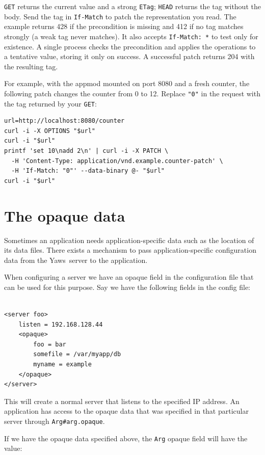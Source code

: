 \documentclass[11pt,oneside,english]{book}
\newcommand{\Yaws}            %
        {{\sc Yaws}}
\begin{document}
\verb+GET+ returns the current value and a strong \verb+ETag+;
\verb+HEAD+ returns the tag without the body. Send the tag in
\verb+If-Match+ to patch the representation you read. The example
returns 428 if the precondition is missing and 412 if no tag matches
strongly (a weak tag never matches). It also accepts \verb+If-Match: *+
to test only for existence. A single process checks the precondition
and applies the operations to a tentative value, storing it only on
success. A successful patch returns 204 with the resulting tag.

For example, with the appmod mounted on port 8080 and a fresh counter,
the following patch changes the counter from 0 to 12. Replace
\verb+"0"+ in the request with the tag returned by your \verb+GET+:

\begin{verbatim}
url=http://localhost:8080/counter
curl -i -X OPTIONS "$url"
curl -i "$url"
printf 'set 10\nadd 2\n' | curl -i -X PATCH \
  -H 'Content-Type: application/vnd.example.counter-patch' \
  -H 'If-Match: "0"' --data-binary @- "$url"
curl -i "$url"
\end{verbatim}


\section{The opaque data}

Sometimes an application needs application-specific data such as the
location of its data files. There exists a mechanism to pass
application-specific configuration data from the \Yaws\ server to the
application.

When configuring a server we have an opaque field in the configuration
file that can be used for this purpose.  Say we have the following
fields in the config file:

\begin{verbatim}

<server foo>
    listen = 192.168.128.44
    <opaque>
        foo = bar
        somefile = /var/myapp/db
        myname = example
    </opaque>
</server>
\end{verbatim}

This will create a normal server that listens to the specified IP address.
An application has access to the opaque data that was specified
in that particular server through \verb+Arg#arg.opaque+.

If we have the opaque data specified above, the \verb+Arg+ opaque
field will have the value:
\end{document}
